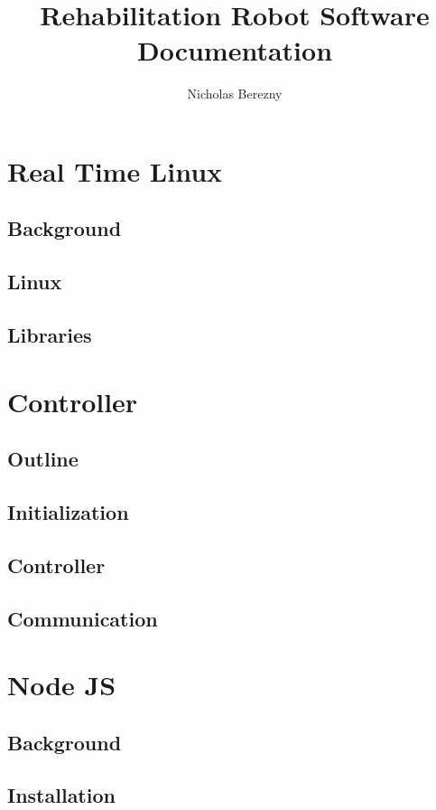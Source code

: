 \documentclass{article}
\author{Nicholas Berezny}
\title{Rehabilitation Robot Software Documentation}
\begin{document}
\maketitle
\newpage

\section{Real Time Linux}
	\subsection{Background}
	
		
	
	\subsection{Linux}
	\subsection{Libraries}

\section{Controller}
	\subsection{Outline}
	\subsection{Initialization}
	\subsection{Controller}
	\subsection{Communication}

\section{Node JS}
	\subsection{Background}
	\subsection{Installation}
\end{document}
